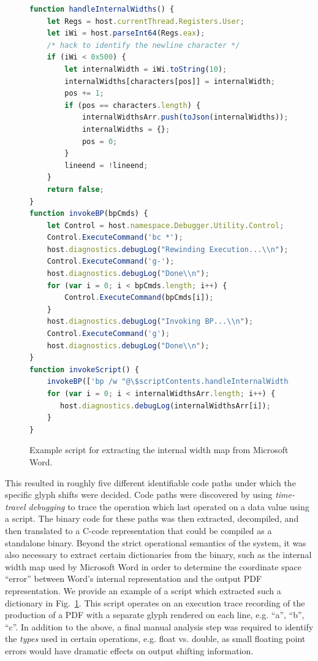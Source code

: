 \begin{figure}
\begin{lstlisting}[language=JavaScript]
function handleInternalWidths() {
    let Regs = host.currentThread.Registers.User;
    let iWi = host.parseInt64(Regs.eax);
    /* hack to identify the newline character */
    if (iWi < 0x500) {
        let internalWidth = iWi.toString(10);
        internalWidths[characters[pos]] = internalWidth;
        pos += 1;
        if (pos == characters.length) {
            internalWidthsArr.push(toJson(internalWidths));
            internalWidths = {};
            pos = 0;
        }
        lineend = !lineend;
    }
    return false;
}
function invokeBP(bpCmds) {
    let Control = host.namespace.Debugger.Utility.Control;
    Control.ExecuteCommand('bc *');
    host.diagnostics.debugLog("Rewinding Execution...\\n");
    Control.ExecuteCommand('g-');
    host.diagnostics.debugLog("Done\\n");
    for (var i = 0; i < bpCmds.length; i++) {
        Control.ExecuteCommand(bpCmds[i]);
    }
    host.diagnostics.debugLog("Invoking BP...\\n");
    Control.ExecuteCommand('g');
    host.diagnostics.debugLog("Done\\n");
}
function invokeScript() {
    invokeBP(['bp /w "@\$scriptContents.handleInternalWidths()" 0x65567138']);
    for (var i = 0; i < internalWidthsArr.length; i++) {
       host.diagnostics.debugLog(internalWidthsArr[i]);
    }
}
\end{lstlisting}
\caption{Example script for extracting the internal width map from Microsoft Word.}
\label{fig:extraction-script}
\end{figure}

This resulted in roughly five different identifiable code paths under which the specific glyph shifts were decided.
Code paths were discovered by using \emph{time-travel debugging} to trace the operation which last operated on a data value using a script.
The binary code for these paths was then extracted, decompiled, and then translated to a C-code representation that could be compiled as a standalone binary.
Beyond the strict operational semantics of the system, it was also necessary to extract certain dictionaries from the binary, such as the internal width map used by Microsoft Word in order to determine the coordinate space ``error'' between Word's internal representation and the output PDF representation.
We provide an example of a script which extracted such a dictionary in Fig.~\ref{fig:extraction-script}.
This script operates on an execution trace recording of the production of a PDF with a separate glyph rendered on each line, e.g. ``a'', ``b'', ``c''.
In addition to the above, a final manual analysis step was required to identify the \emph{types} used in certain operations, e.g. float vs. double, as small floating point errors would have dramatic effects on output shifting information.

